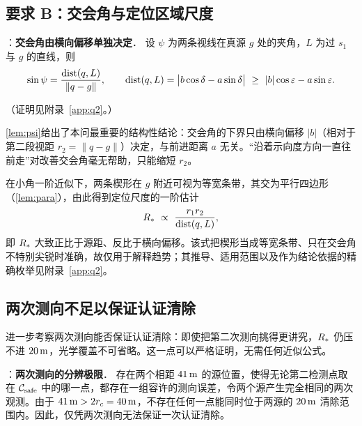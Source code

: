 \subsection{要求 B：交会角与定位区域尺度}

\begin{lemma}：\textbf{交会角由横向偏移单独决定}．\label{lem:psi}
设 $\psi$ 为两条视线在真源 $g$ 处的夹角，$L$ 为过 $s_1$ 与 $g$ 的直线，则
\begin{equation}\label{eq:sinpsi}
  \sin\psi=\frac{\dist(q,L)}{\|q-g\|},\qquad
  \dist(q,L)=\bigl|b\cos\delta-a\sin\delta\bigr|\ \ge\ |b|\cos\varepsilon-a\sin\varepsilon .
\end{equation}
\end{lemma}

\noindent（证明见附录~\ref{app:q2}。）

\cref{lem:psi}给出了本问最重要的结构性结论：交会角的下界只由横向偏移 $|b|$（相对于第二段视距 $r_2=\|q-g\|$）决定，与前进距离 $a$ 无关。“沿着示向度方向一直往前走”对改善交会角毫无帮助，只能缩短 $r_2$。

在小角一阶近似下，两条楔形在 $g$ 附近可视为等宽条带，其交为平行四边形（\cref{lem:para}），由此得到定位尺度的一阶估计
\begin{equation}\label{eq:Rapprox}
  R_{*}\ \propto\ \frac{r_1r_2}{\operatorname{dist}(q,L)},
\end{equation}
即 $R_{*}$ 大致正比于源距、反比于横向偏移。该式把楔形当成等宽条带、只在交会角不特别尖锐时准确，故仅用于解释趋势；其推导、适用范围以及作为结论依据的精确枚举见附录~\ref{app:q2}。

\subsection{两次测向不足以保证认证清除}

进一步考察两次测向能否保证认证清除：即使把第二次测向挑得更讲究，$R_{*}$ 仍压不进 $20\,\mathrm{m}$，光学覆盖不可省略。这一点可以严格证明，无需任何近似公式。

\begin{theorem}：\textbf{两次测向的分辨极限}．\label{thm:twobearing}
存在两个相距 $41\,\mathrm{m}$ 的源位置，使得无论第二检测点取在 $\mathcal C_{\rm safe}$ 中的哪一点，都存在一组容许的测向误差，令两个源产生完全相同的两次观测。由于 $41\,\mathrm{m}>2r_c=40\,\mathrm{m}$，不存在任何一点能同时位于两源的 $20\,\mathrm{m}$ 清除范围内。因此，仅凭两次测向无法保证一次认证清除。
\end{theorem}

